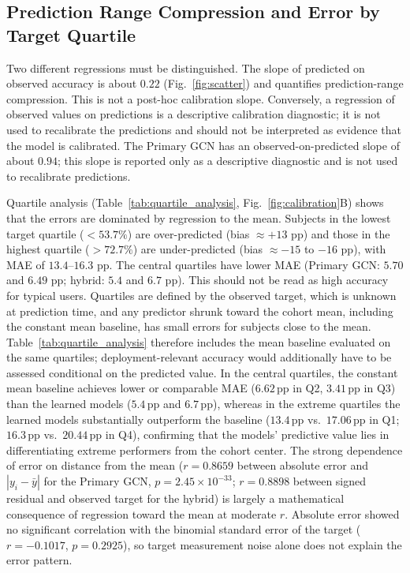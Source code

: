 \documentclass{ieeeaccess}
\newcommand{\pp}{\,\text{pp}}
\begin{document}
\subsection{Prediction Range Compression and Error by Target Quartile}

Two different regressions must be distinguished. The slope of predicted on observed accuracy is about $0.22$ (Fig.~\ref{fig:scatter}) and quantifies prediction-range compression. This is not a post-hoc calibration slope. Conversely, a regression of observed values on predictions is a descriptive calibration diagnostic; it is not used to recalibrate the predictions and should not be interpreted as evidence that the model is calibrated. The Primary GCN has an observed-on-predicted slope of about $0.94$; this slope is reported only as a descriptive diagnostic and is not used to recalibrate predictions.

Quartile analysis (Table~\ref{tab:quartile_analysis}, Fig.~\ref{fig:calibration}B) shows that the errors are dominated by regression to the mean. Subjects in the lowest target quartile ($<53.7\%$) are over-predicted (bias $\approx+13$ pp) and those in the highest quartile ($>72.7\%$) are under-predicted (bias $\approx-15$ to $-16$ pp), with MAE of $13.4$--$16.3$ pp. The central quartiles have lower MAE (Primary GCN: $5.70$ and $6.49$ pp; hybrid: $5.4$ and $6.7$ pp). This should not be read as high accuracy for typical users. Quartiles are defined by the observed target, which is unknown at prediction time, and any predictor shrunk toward the cohort mean, including the constant mean baseline, has small errors for subjects close to the mean. Table~\ref{tab:quartile_analysis} therefore includes the mean baseline evaluated on the same quartiles; deployment-relevant accuracy would additionally have to be assessed conditional on the predicted value. In the central quartiles, the constant mean baseline achieves lower or comparable MAE ($6.62\pp$ in Q2, $3.41\pp$ in Q3) than the learned models ($5.4\pp$ and $6.7\pp$), whereas in the extreme quartiles the learned models substantially outperform the baseline ($13.4\pp$ vs.\ $17.06\pp$ in Q1; $16.3\pp$ vs.\ $20.44\pp$ in Q4), confirming that the models' predictive value lies in differentiating extreme performers from the cohort center. The strong dependence of error on distance from the mean ($r=0.8659$ between absolute error and $|y_i-\bar y|$ for the Primary GCN, $p=2.45\times10^{-33}$; $r=0.8898$ between signed residual and observed target for the hybrid) is largely a mathematical consequence of regression toward the mean at moderate $r$. Absolute error showed no significant correlation with the binomial standard error of the target ($r=-0.1017$, $p=0.2925$), so target measurement noise alone does not explain the error pattern.
\end{document}
